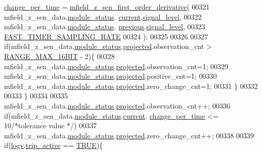 \begin{DoxyCode}
      \hyperlink{a00019_a0f645dd76b41adc6a966feba8e4bff8c}{change\_per\_time} = \hyperlink{a00053_a82939d05c14b8ab80cacc21b7a1b8d3e}{mfield\_z\_sen\_first\_order\_derivative}(
00321                                             mfield\_z\_sen\_data.\hyperlink{a00027_adfab5a5d8b45a93dfb13edb24e2b80e3}{module\_status}.
      \hyperlink{a00019_acf41ffc11da291c2f9f0fcb02ee72b98}{current}.\hyperlink{a00019_a4070db8eab0ff93e3fbc1df59872f117}{signal\_level},
00322                                             mfield\_z\_sen\_data.\hyperlink{a00027_adfab5a5d8b45a93dfb13edb24e2b80e3}{module\_status}.
      \hyperlink{a00019_adcb859b2f3983a9c58deab28e59c333f}{previous}.\hyperlink{a00019_a4070db8eab0ff93e3fbc1df59872f117}{signal\_level},
00323                                             \hyperlink{a00021_a3a4dcb8af26a561d90607a41a3745806}{FAST\_TIMER\_SAMPLING\_RATE}
00324                                             );
00325 
00326 
00327          \textcolor{keywordflow}{if}(mfield\_z\_sen\_data.\hyperlink{a00027_adfab5a5d8b45a93dfb13edb24e2b80e3}{module\_status}.\hyperlink{a00019_af2267fb093fb5dcaa006a570a6da3b6b}{projected}.observation\_cnt > 
      \hyperlink{a00021_ae01726ef8ba0a9e1fe8655dc382ecda8}{RANGE\_MAX\_16BIT} - 2)\{
00328          mfield\_z\_sen\_data.\hyperlink{a00027_adfab5a5d8b45a93dfb13edb24e2b80e3}{module\_status}.\hyperlink{a00019_af2267fb093fb5dcaa006a570a6da3b6b}{projected}.observation\_cnt=1;
00329          mfield\_z\_sen\_data.\hyperlink{a00027_adfab5a5d8b45a93dfb13edb24e2b80e3}{module\_status}.\hyperlink{a00019_af2267fb093fb5dcaa006a570a6da3b6b}{projected}.positive\_cnt=1;
00330          mfield\_z\_sen\_data.\hyperlink{a00027_adfab5a5d8b45a93dfb13edb24e2b80e3}{module\_status}.\hyperlink{a00019_af2267fb093fb5dcaa006a570a6da3b6b}{projected}.zero\_change\_cnt=1;
00331          \}
00332 
00333     \}
00334 
00335          mfield\_z\_sen\_data.\hyperlink{a00027_adfab5a5d8b45a93dfb13edb24e2b80e3}{module\_status}.\hyperlink{a00019_af2267fb093fb5dcaa006a570a6da3b6b}{projected}.observation\_cnt++;
00336          \textcolor{keywordflow}{if}(mfield\_z\_sen\_data.\hyperlink{a00027_adfab5a5d8b45a93dfb13edb24e2b80e3}{module\_status}.\hyperlink{a00019_acf41ffc11da291c2f9f0fcb02ee72b98}{current}.
      \hyperlink{a00019_a0f645dd76b41adc6a966feba8e4bff8c}{change\_per\_time} <= 10\textcolor{comment}{/*tolerance value */})
00337                  mfield\_z\_sen\_data.\hyperlink{a00027_adfab5a5d8b45a93dfb13edb24e2b80e3}{module\_status}.\hyperlink{a00019_af2267fb093fb5dcaa006a570a6da3b6b}{projected}.zero\_change\_cnt++;
00338 
00339     \textcolor{keywordflow}{if}(\hyperlink{a00021_a2e89c46668b39a17753c238950c9e1ec}{logv}.\hyperlink{a00021_a32ebd32977bc9831cd68530b2b7ec664}{trip\_active} == \hyperlink{a00040_aa8cecfc5c5c054d2875c03e77b7be15d}{TRUE})\{

\end{DoxyCode}
